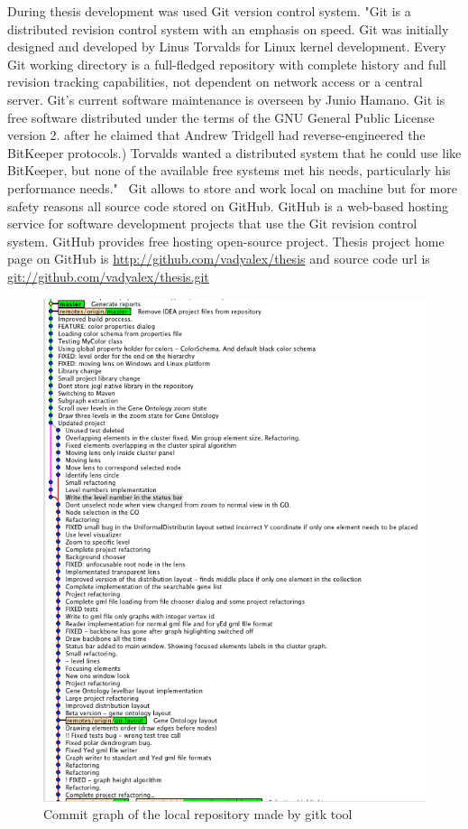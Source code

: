 \documentclass[a4paper,oneside]{article}
\begin{document}
During thesis development was used Git version control system. "Git is a distributed revision control system with an emphasis on speed. Git was initially designed and developed by Linus Torvalds for Linux kernel development. Every Git working directory is a full-fledged repository with complete history and full revision tracking capabilities, not dependent on network access or a central server. Git's current software maintenance is overseen by Junio Hamano. Git is free software distributed under the terms of the GNU General Public License version 2. after he claimed that Andrew Tridgell had reverse-engineered the BitKeeper protocols.)
Torvalds wanted a distributed system that he could use like BitKeeper, but none of the available free systems met his needs, particularly his performance needs."~\cite{GIT} Git allows to store and work local on machine but for more safety reasons all source code stored on GitHub. GitHub is a web-based hosting service for software development projects that use the Git revision control system. GitHub provides free hosting open-source project. Thesis project home page on GitHub is \url{http://github.com/vadyalex/thesis} and source code url is \url{git://github.com/vadyalex/thesis.git} 

\begin{figure}
\begin{center}
	\includegraphics[scale=0.6]{commit_graph_gitk.png}
	\caption{Commit graph of the local repository made by gitk tool}
\end{center}
\end{figure}
\end{document}
